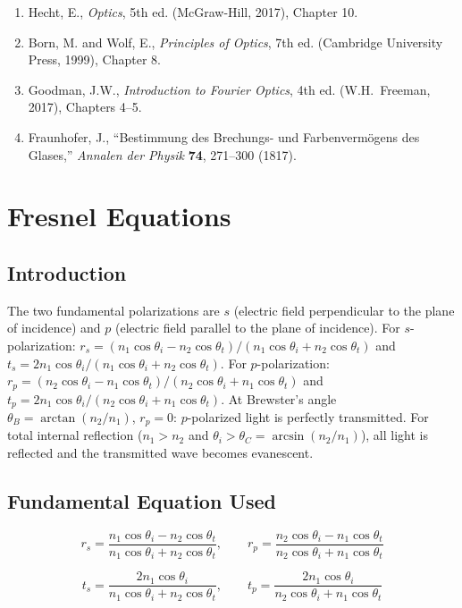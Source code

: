 \documentclass[11pt,openright]{book}
\begin{document}
\begin{enumerate}
\item Hecht, E., \textit{Optics}, 5th ed. (McGraw-Hill, 2017), Chapter 10.
\item Born, M. and Wolf, E., \textit{Principles of Optics}, 7th ed. (Cambridge University Press, 1999), Chapter 8.
\item Goodman, J.W., \textit{Introduction to Fourier Optics}, 4th ed. (W.H.\ Freeman, 2017), Chapters 4--5.
\item Fraunhofer, J., ``Bestimmung des Brechungs- und Farbenverm\"ogens des Glases,'' \textit{Annalen der Physik} \textbf{74}, 271--300 (1817).
\end{enumerate}


\chapter{Fresnel Equations}

\section*{Introduction}

The two fundamental polarizations are $s$ (electric field perpendicular to the plane of incidence) and $p$ (electric field parallel to the plane of incidence). For $s$-polarization: $r_s = (n_1\cos\theta_i - n_2\cos\theta_t)/(n_1\cos\theta_i + n_2\cos\theta_t)$ and $t_s = 2n_1\cos\theta_i/(n_1\cos\theta_i + n_2\cos\theta_t)$. For $p$-polarization: $r_p = (n_2\cos\theta_i - n_1\cos\theta_t)/(n_2\cos\theta_i + n_1\cos\theta_t)$ and $t_p = 2n_1\cos\theta_i/(n_2\cos\theta_i + n_1\cos\theta_t)$. At Brewster's angle $\theta_B = \arctan(n_2/n_1)$, $r_p = 0$: $p$-polarized light is perfectly transmitted. For total internal reflection ($n_1 > n_2$ and $\theta_i > \theta_C = \arcsin(n_2/n_1)$), all light is reflected and the transmitted wave becomes evanescent.
\section*{Fundamental Equation Used}

\[
r_s = \frac{n_1\cos\theta_i - n_2\cos\theta_t}{n_1\cos\theta_i + n_2\cos\theta_t},\qquad r_p = \frac{n_2\cos\theta_i - n_1\cos\theta_t}{n_2\cos\theta_i + n_1\cos\theta_t}
\]

\[
t_s = \frac{2n_1\cos\theta_i}{n_1\cos\theta_i + n_2\cos\theta_t},\qquad t_p = \frac{2n_1\cos\theta_i}{n_2\cos\theta_i + n_1\cos\theta_t}
\]
\end{document}
